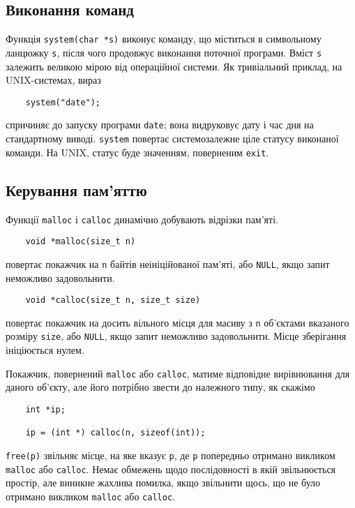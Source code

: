 \documentclass[a4paper,12pt]{book}
\begin{document}
\subsection{Виконання команд}


  Функція \texttt{system(char *s)} виконує команду, що міститься в символьному ланцюжку
  \texttt{s}, після чого продовжує виконання поточної програми. Вміст \texttt{s} залежить
  великою мірою від операційної системи. Як тривіальний приклад, на UNIX-системах, вираз
  \begin{verbatim}
    system("date");
  \end{verbatim}
  спричиняє до запуску програми \texttt{date}; вона видруковує дату і час дня на
  стандартному виводі. \texttt{system} повертає системозалежне ціле статусу виконаної
  команди. На UNIX, статус буде значенням, поверненим \texttt{exit}.

\subsection{Керування пам'яттю}


  Функції \texttt{malloc} і \texttt{calloc} динамічно добувають відрізки пам'яті.
  \begin{verbatim}
    void *malloc(size_t n)
  \end{verbatim}
  повертає покажчик на \texttt{n} байтів неініційованої пам'яті, або \texttt{NULL}, якщо
  запит неможливо задовольнити.
  \begin{verbatim}
    void *calloc(size_t n, size_t size)
  \end{verbatim}
  повертає покажчик на досить вільного місця для масиву з \texttt{n} об'єктами вказаного
  розміру \texttt{size}, або \texttt{NULL}, якщо запит неможливо задовольнити. Місце
  зберігання ініціюється нулем.

  Покажчик, повернений \texttt{malloc} або \texttt{calloc}, матиме відповідне вирівнювання
  для даного об'єкту, але його потрібно звести до належного типу, як скажімо
  \begin{verbatim}
    int *ip;

    ip = (int *) calloc(n, sizeof(int));
  \end{verbatim}

  \texttt{free(p)} звільняє місце, на яке вказує \texttt{p}, де \texttt{p} попередньо
  отримано викликом \texttt{malloc} або \texttt{calloc}. Немає обмежень щодо послідовності
  в якій звільнюється простір, але виникне жахлива помилка, якщо звільнити щось, що не
  було отримано викликом \texttt{malloc} або \texttt{calloc}.
\end{document}
